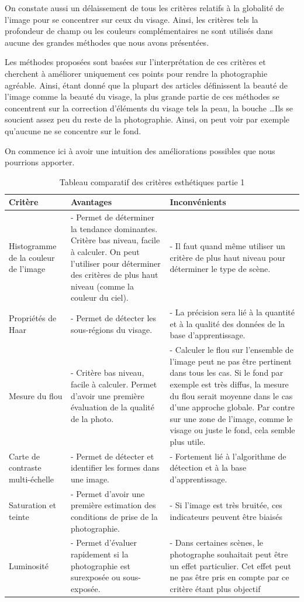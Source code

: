 \documentclass[11pt, french]{report-rd-info}
\begin{document}
On constate aussi un délaissement de tous les critères relatifs à la globalité de l’image pour se concentrer sur ceux du visage. Ainsi, les critères tels la profondeur de champ ou les couleurs complémentaires ne sont utilisés dans aucune des grandes méthodes que nous avons présentées.

Les méthodes proposées sont basées sur l’interprétation de ces critères et cherchent à améliorer uniquement ces points pour rendre la photographie agréable. Ainsi, étant donné que la plupart des articles définissent la beauté de l’image comme la beauté du visage, la plus grande partie de ces méthodes se concentrent sur la correction d’éléments du visage tels la peau, la bouche \ldots Ils se soucient assez peu du reste de la photographie. Ainsi, on peut voir par exemple qu’aucune ne se concentre sur le fond.

On commence ici à avoir une intuition des améliorations possibles que nous pourrions apporter.
\begin{table}
\begin{center}
\begin{tabular}{|p{3cm}|p{6cm}|p{7cm}|}
\hline
\textbf{Critère} & \textbf{Avantages} & \textbf{Inconvénients} \\ \hline
Histogramme de la couleur de l'image & - Permet de déterminer la tendance dominantes. Critère bas niveau, facile à calculer. On peut l'utiliser pour déterminer des critères de plus haut niveau (comme la couleur du ciel). & - Il faut quand même utiliser un critère de plus haut niveau pour déterminer le type de scène. \\ \hline
Propriétés de Haar & - Permet de détecter les sous-régions du visage. & - La précision sera lié à la quantité et à la qualité des données de la base d'apprentissage. \\ \hline
Mesure du flou & - Critère bas niveau, facile à calculer. Permet d'avoir une première évaluation de la qualité de la photo. & - Calculer le flou sur l'ensemble de l'image peut ne pas être pertinent dans tous les cas. Si le fond par exemple est très diffus, la mesure du flou serait moyenne dans le cas d'une approche globale. Par contre sur une zone de l'image, comme le visage ou juste le fond, cela semble plus utile. \\ \hline
Carte de contraste multi-échelle & - Permet de détecter et identifier les formes dans une image. & - Fortement lié à l’algorithme de détection et à la base d'apprentissage. \\ \hline
Saturation et teinte & - Permet d'avoir une première estimation des conditions de prise de la photographie. & - Si l'image est très bruitée, ces indicateurs peuvent être biaisés \\ \hline
Luminosité & - Permet d'évaluer rapidement si la photographie est surexposée ou sous-exposée. & - Dans certaines scènes, le photographe souhaitait peut être un effet particulier. Cet effet peut ne pas être pris en compte par ce critère étant plus objectif\\ \hline
\end{tabular}
\end{center}
\caption{Tableau comparatif des critères esthétiques partie 1}
\label{tab:ComparaisonCriteres1}
\end{table}
\end{document}
